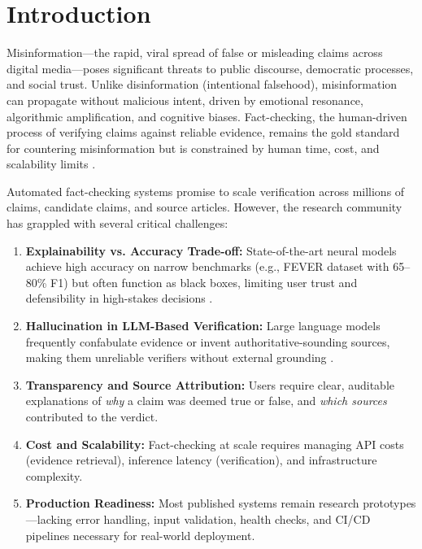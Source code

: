 \documentclass[12pt,a4paper,twoside]{article}
\begin{document}
\section{Introduction}

Misinformation—the rapid, viral spread of false or misleading claims across digital media—poses significant threats to public discourse, democratic processes, and social trust. Unlike disinformation (intentional falsehood), misinformation can propagate without malicious intent, driven by emotional resonance, algorithmic amplification, and cognitive biases. Fact-checking, the human-driven process of verifying claims against reliable evidence, remains the gold standard for countering misinformation but is constrained by human time, cost, and scalability limits \cite{levy2018misinformation}.

Automated fact-checking systems promise to scale verification across millions of claims, candidate claims, and source articles. However, the research community has grappled with several critical challenges:

\begin{enumerate}
    \item \textbf{Explainability vs. Accuracy Trade-off:} State-of-the-art neural models achieve high accuracy on narrow benchmarks (e.g., FEVER dataset with 65--80\% F1) but often function as black boxes, limiting user trust and defensibility in high-stakes decisions \cite{grave2020factool}.
    
    \item \textbf{Hallucination in LLM-Based Verification:} Large language models frequently confabulate evidence or invent authoritative-sounding sources, making them unreliable verifiers without external grounding \cite{galitsky2023truth}.
    
    \item \textbf{Transparency and Source Attribution:} Users require clear, auditable explanations of \textit{why} a claim was deemed true or false, and \textit{which sources} contributed to the verdict.
    
    \item \textbf{Cost and Scalability:} Fact-checking at scale requires managing API costs (evidence retrieval), inference latency (verification), and infrastructure complexity.
    
    \item \textbf{Production Readiness:} Most published systems remain research prototypes—lacking error handling, input validation, health checks, and CI/CD pipelines necessary for real-world deployment.
\end{enumerate}
\end{document}
